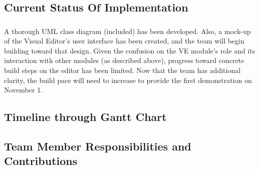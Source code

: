 \documentclass{llncs}
\begin{document}
\subsection{Current Status Of Implementation}
\subsubsection{}
A thorough UML class diagram (included) has been developed.  Also, a mock-up of the Visual Editor’s user interface has been created, and the team will begin building toward that design. Given the confusion on the VE module’s role and its interaction with other modules (as described above), progress toward concrete build steps on the editor has been limited.  Now that the team has additional clarity, the build pace will need to increase to provide the first demonstration on November 1.  

\subsection{Timeline through Gantt Chart}
\subsubsection{}
\noindent{}

\subsection{Team Member Responsibilities and Contributions}
\end{document}
